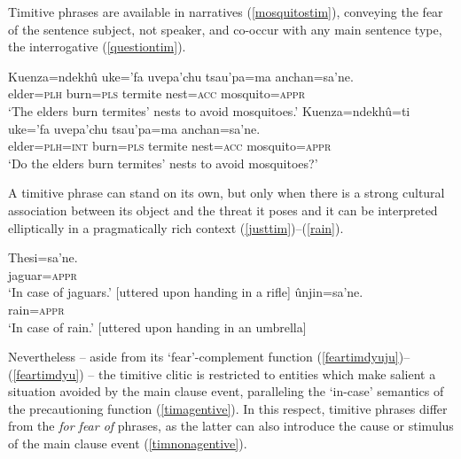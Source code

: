 \documentclass[output=paper,colorlinks,citecolor=brown]{langscibook}
\begin{document}
Timitive phrases are available in narratives (\ref{mosquitostim}), conveying the fear of the sentence subject, not speaker, and co-occur with any main sentence type, \eg the interrogative (\ref{questiontim}).

  \begin{exe} \ex \label{mosquitostim}
    
    \gll Kuenza=ndekhû uke='fa     uvepa'chu tsau'pa=ma {\ob}anchan=sa'ne.{\cb} \\
         elder=\textsc{plh}    burn=\textsc{pls} termite    nest=\textsc{acc} mosquito=\textsc{appr} \\
    \glt `The elders burn termites' nests to avoid mosquitoes.'
    \ex \label{questiontim}
    \gll Kuenza=ndekhû=ti uke='fa     uvepa'chu tsau'pa=ma {\ob}anchan=sa'ne.{\cb} \\
         elder=\textsc{plh=int}    burn=\textsc{pls} termite    nest=\textsc{acc} mosquito=\textsc{appr} \\
    \glt `Do the elders burn termites' nests to avoid mosquitoes?'
\end{exe}

    
A timitive phrase can stand on its own, but only when there is a strong cultural association between its object and the threat it poses and it can be interpreted elliptically in a pragmatically rich context (\ref{justtim})--(\ref{rain}).

    \begin{exe} \ex \label{justtim}
    \gll {\ob}Thesi=sa'ne.{\cb} \\
         jaguar=\textsc{appr} \\
    \glt `In case of jaguars.' [uttered upon handing in a rifle]
    \ex \label{rain}
    \gll {\ob}ûnjin=sa'ne.{\cb} \\
         rain=\textsc{appr} \\
    \glt `In case of rain.' [uttered upon handing in an umbrella]
\end{exe}    

Nevertheless -- aside from its `fear'-complement function (\ref{feartimdyuju})--(\ref{feartimdyu}) -- the timitive clitic  is restricted to {entities which make salient a situation avoided by the main clause event, paralleling the `in-case' semantics of the precautioning function (\ref{timagentive}). In this respect,   timitive phrases differ from the  \textit{for fear of} phrases, as the latter can also introduce the cause or stimulus of the main clause event (\ref{timnonagentive}).}
\end{document}
